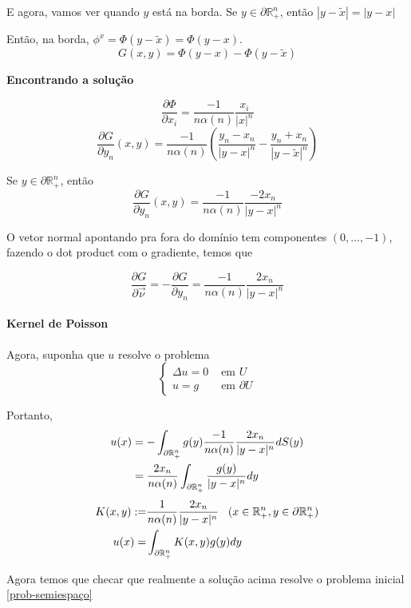 \documentclass[11pt]{article}
\newcommand{\p}{\partial}
\newcommand{\pde}[2]{\frac{\p #1}{\p #2}}
\newcommand{\dirdev}[1]{\pde{#1}{\vec{\nu}}}
\begin{document}
E agora, vamos ver quando \(y\) está na borda.
Se \(y \in \p\mathbb{R}^n_+\), então \( |y - \tilde{x} | = |y-x | \)

Então, na borda, \(\phi^x = \Phi(y-\tilde{x}) = \Phi(y-x)\).
\[ G(x,y) = \Phi(y-x) - \Phi(y-\tilde{x}) \]





\textbf{Encontrando a solução}

\begin{equation}\label{derivada-da-Phi}
	\frac{\p\Phi}{\p x_i} = \frac{-1}{n \alpha(n)} \frac{x_i}{|x|^n}
\end{equation} 
\[ \frac{\p G}{\p y_n}(x,y) = \frac{-1}{n \alpha(n)} \left ( \frac{y_n - x_n}{|y-x|^n} - \frac{y_n+x_n}{|y-\tilde{x}|^n} \right ) \]

Se \(y \in \partial\mathbb{R}^n_+\), então
\[ \frac{\partial G}{\partial y_n}(x,y) = \frac{-1}{n \alpha(n)}\frac{-2x_n}{|y-x|^n} \]

O vetor normal apontando pra fora do domínio tem componentes \((0,\ldots,-1)\), fazendo o dot product com o gradiente, temos que

\[ \dirdev{G} = - \pde{G}{y_n} = \frac{-1}{n \alpha(n)}\frac{2x_n}{|y-x|^n}\]

\paragraph{Kernel de Poisson}

Agora, suponha que \(u\) resolve o problema
\begin{equation}\label{prob-semiespaço}
\begin{cases}
	\Delta u = 0 & \text{ em } U\\
	u = g & \text{ em } \p U
\end{cases}
\end{equation}

Portanto,
\begin{align*}
	u(x) &= - \int_{\partial \mathbb{R}^n_+} g(y) \frac{-1}{n \alpha(n)}\frac{2x_n}{|y-x|^n} dS(y)\\
	&= \frac{2x_n}{n \alpha(n)} \int_{\partial \mathbb{R}^n_+} \frac{g(y)}{|y-x|^n} dy
\end{align*}
\begin{align*}
	K(x,y) :=& \frac{1}{n \alpha(n)}\frac{2x_n}{|y-x|^n} \;\;\; (x \in \seR, y \in \p\seR)\\
	u(x) =& \int_{\p\seR} K(x,y) g(y) dy 
\end{align*}


Agora temos que checar que realmente a solução acima resolve o problema inicial \eqref{prob-semiespaço}
\end{document}
